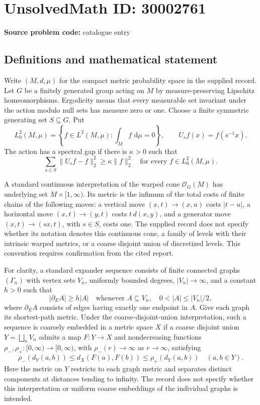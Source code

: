 \documentclass[11pt]{article}
\newcommand{\dd}{\,\mathrm{d}}
\begin{document}
\section*{UnsolvedMath ID: 30002761}
\textbf{Source problem code:} catalogue entry
\subsection{Definitions and mathematical statement}
Write \((M,d,\mu)\) for the compact metric probability space in the supplied record. Let \(G\) be a finitely generated group acting on \(M\) by measure-preserving Lipschitz homeomorphisms. Ergodicity means that every measurable set invariant under the action modulo null sets has measure zero or one. Choose a finite symmetric generating set \(S\subseteq G\). Put
\[
L^2_0(M,\mu)=\left\{f\in L^2(M,\mu):\int_M f\,\dd\mu=0\right\},
\qquad U_s f(x)=f(s^{-1}x).
\]
The action has a spectral gap if there is \(\kappa>0\) such that
\[
\sum_{s\in S}\|U_s f-f\|_2^2\geq \kappa\|f\|_2^2
\quad\text{for every }f\in L^2_0(M,\mu).
\]

A standard continuous interpretation of the warped cone \(\mathcal O_G(M)\) has underlying set \(M\times[1,\infty)\). Its metric is the infimum of the total costs of finite chains of the following moves: a vertical move \((x,t)\to(x,u)\) costs \(|t-u|\), a horizontal move \((x,t)\to(y,t)\) costs \(t\,d(x,y)\), and a generator move \((x,t)\to(sx,t)\), with \(s\in S\), costs one. The supplied record does not specify whether its notation denotes this continuous cone, a family of levels with their intrinsic warped metrics, or a coarse disjoint union of discretized levels. This convention requires confirmation from the cited report.

For clarity, a standard expander sequence consists of finite connected graphs \((\Gamma_n)\) with vertex sets \(V_n\), uniformly bounded degrees, \(|V_n|\to\infty\), and a constant \(h>0\) such that
\[
|\partial_E A|\geq h|A|
\quad\text{whenever }A\subseteq V_n,\quad 0<|A|\leq |V_n|/2,
\]
where \(\partial_E A\) consists of edges having exactly one endpoint in \(A\). Give each graph its shortest-path metric. Under the coarse-disjoint-union interpretation, such a sequence is coarsely embedded in a metric space \(X\) if a coarse disjoint union \(Y=\bigsqcup_n V_n\) admits a map \(F:Y\to X\) and nondecreasing functions \(\rho_-,\rho_+:[0,\infty)\to[0,\infty)\), with \(\rho_-(r)\to\infty\) as \(r\to\infty\), satisfying
\[
\rho_-(d_Y(a,b))\leq d_X(F(a),F(b))\leq\rho_+(d_Y(a,b))
\quad(a,b\in Y).
\]
Here the metric on \(Y\) restricts to each graph metric and separates distinct components at distances tending to infinity. The record does not specify whether this interpretation or uniform coarse embeddings of the individual graphs is intended.
\end{document}
